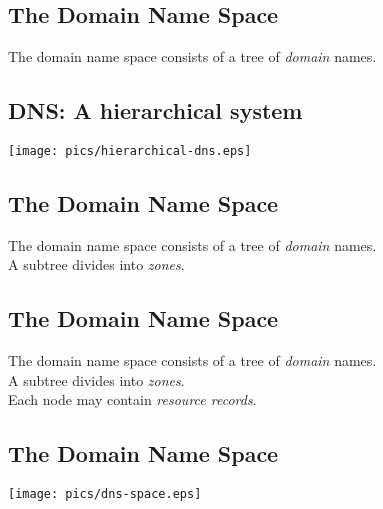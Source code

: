 \documentclass[xga]{xdvislides}
\begin{document}
\subsection{The Domain Name Space}
\vspace{.5in}
\begin{center}
	\Huge
	The domain name space consists of a tree of {\em domain} names.
\end{center}
\Normalsize

\subsection{DNS: A hierarchical system}
\vspace*{\fill}
\begin{center}
	\texttt{[image: pics/hierarchical-dns.eps]}
\end{center}
\vspace*{\fill}

\subsection{The Domain Name Space}
\vspace{.5in}
\begin{center}
	\Huge
	The domain name space consists of a tree of {\em domain} names. \\
	\vspace{.5in}
	A subtree divides into {\em zones}.
\end{center}
\Normalsize

\subsection{The Domain Name Space}
\vspace{.5in}
\begin{center}
	\Huge
	The domain name space consists of a tree of {\em domain} names. \\
	\vspace{.5in}
	A subtree divides into {\em zones}. \\
	\vspace{.5in}
	Each node may contain {\em resource records}.
\end{center}
\Normalsize

\subsection{The Domain Name Space}
\vspace*{\fill}
\begin{center}
	\texttt{[image: pics/dns-space.eps]}
\end{center}
\vspace*{\fill}
\end{document}
